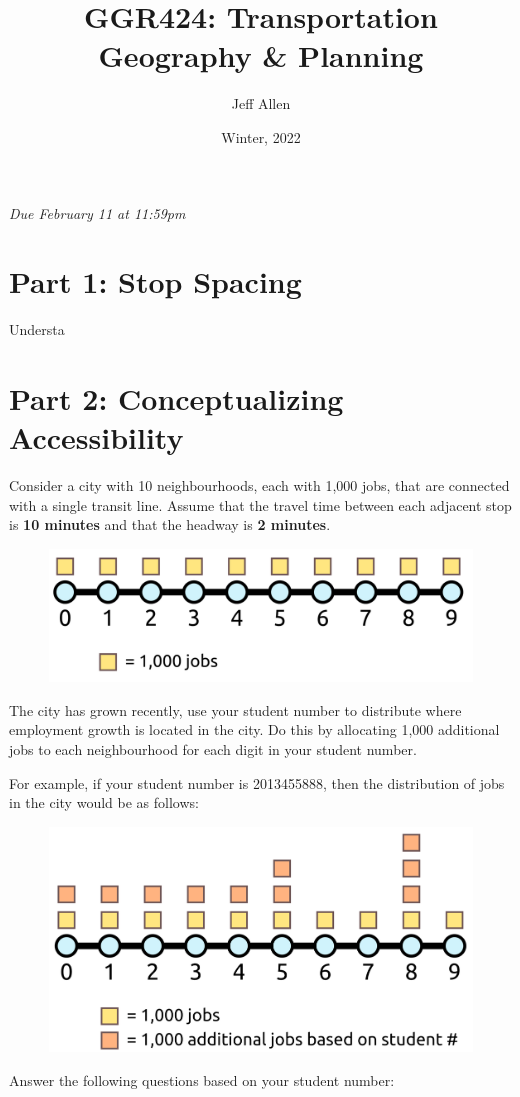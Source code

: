 \documentclass[11pt]{article}
\title{\textbf{GGR424: Transportation Geography \& Planning}}
\author{Jeff Allen}
\date{Winter, 2022}
\begin{document}
	\allsectionsfont{\sffamily}
		
	\textit{Due February 11 at 11:59pm}
	
	
	\section*{Part 1: Stop Spacing}
	
	Understa
	
	
		
	\section*{Part 2: Conceptualizing Accessibility}
	
	Consider a city with 10 neighbourhoods, each with 1,000 jobs, that are connected with a single transit line. Assume that the travel time between each adjacent stop is \textbf{10 minutes} and that the headway is \textbf{2 minutes}. 
	
	\begin{figure}[h]
		\centering
		\includegraphics[width=0.5\linewidth]{images/city_plain.png}
	\end{figure}

	The city has grown recently, use your student number to distribute where employment growth is located in the city. Do this by allocating 1,000 additional jobs to each neighbourhood for each digit in your student number.
	
	For example, if your student number is 2013455888, then the distribution of jobs in the city would be as follows:
	
	\begin{figure}[h]
		\centering
		\includegraphics[width=0.5\linewidth]{images/city_jobs.png}
	\end{figure}
	
	Answer the following questions based on your student number:
	
\end{document}
